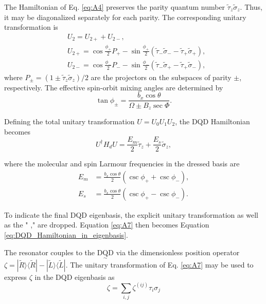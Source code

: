 \documentclass[12pt]{article}
\begin{document}
The Hamiltonian of Eq. \ref{eq:A4} preserves the parity quantum number $\tilde{\tau}_z \tilde{\sigma}_z$. Thus, it may be diagonalized separately for each parity. The corresponding unitary transformation is
$$
\begin{aligned}
& U_2=U_{2+}+U_{2-}, \\
& U_{2+}=\cos \frac{\phi_{+}}{2} P_{+}-\sin \frac{\phi_{+}}{2}\left(\tilde{\tau}_{-} \tilde{\sigma}_{-}-\tilde{\tau}_{+} \tilde{\sigma}_{+}\right), \\
& U_{2-}=\cos \frac{\phi_{-}}{2} P_{-}-\sin \frac{\phi_{-}}{2}\left(\tilde{\tau}_{-} \tilde{\sigma}_{+}-\tilde{\tau}_{+} \tilde{\sigma}_{-}\right),
\end{aligned}
$$
where $P_{ \pm}=\left(1 \pm \tilde{\tau}_z \widetilde{\sigma}_z\right) / 2$ are the projectors on the subspaces of parity $\pm$, respectively. The effective spin-orbit mixing angles are determined by
$$
\tan \phi_{ \pm}=\frac{b_x \cos \theta}{\Omega \pm B_z \sec \Phi} .
$$

Defining the total unitary transformation $U=U_0 U_1 U_2$, the DQD Hamiltonian becomes
\begin{equation}\label{eq:A7}
    U^{\dagger} H_d U=\frac{E_m}{2} \widetilde{\tau}_z+\frac{E_s}{2} \widetilde{\sigma}_z,
\end{equation}

where the molecular and spin Larmour frequencies in the dressed basis are
\begin{equation}\label{eq:A8}
    \begin{aligned}
        E_m & =\frac{b_x \cos \theta}{2}\left(\csc \phi_{+}+\csc \phi_{-}\right), \\
        E_s & =\frac{b_x \cos \theta}{2}\left(\csc \phi_{+}-\csc \phi_{-}\right) .
        \end{aligned}
\end{equation}

To indicate the final DQD eigenbasis, the explicit unitary transformation as well as the " ," are dropped. Equation \ref{eq:A7} then becomes Equation \ref{eq:DQD_Hamiltonian_in_eigenbasis}.

The resonator couples to the $\underset{\sim}{\mathrm{DQD}}$ via the dimensionless position operator $\zeta=|\widetilde{R}\rangle\langle\widetilde{R}|-| \widetilde{L}\rangle\langle\widetilde{L}|$. 
The unitary transformation of Eq. \ref{eq:A7} may be used to express $\zeta$ in the DQD eigenbasis as
$$
\zeta=\sum_{i, j} \zeta^{(i j)} \tau_i \sigma_j
$$
\end{document}
